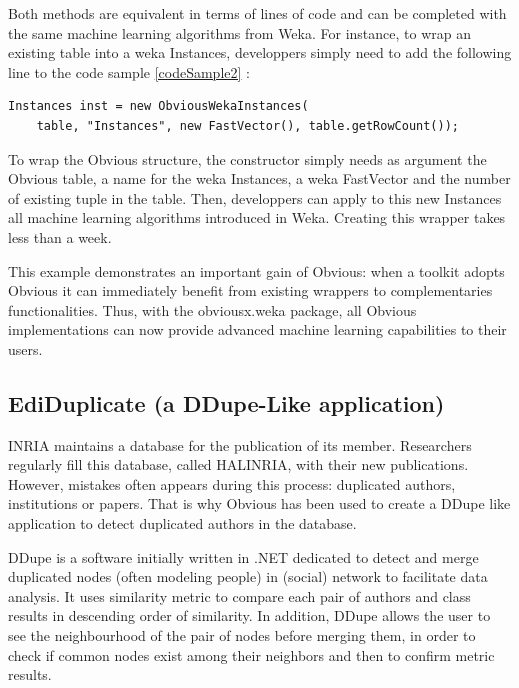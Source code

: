 Both methods are equivalent in terms of lines of code and can be completed with the same machine learning algorithms from Weka. For instance, to wrap an existing table into a weka Instances, developpers simply need to add the following line to the code sample \ref{codeSample2} :

\begin{lstlisting}
Instances inst = new ObviousWekaInstances(
    table, "Instances", new FastVector(), table.getRowCount());
\end{lstlisting}

To wrap the Obvious structure, the constructor simply needs as argument the Obvious table, a name for the weka Instances, a weka FastVector and the number of existing tuple in the table. Then, developpers can apply to this new Instances all machine learning algorithms introduced in Weka. Creating this wrapper takes less than a week.

This example demonstrates an important gain of Obvious: when a toolkit adopts Obvious it can immediately benefit from existing wrappers to complementaries functionalities. Thus, with the obviousx.weka package, all Obvious implementations can now provide advanced machine learning capabilities to their users.

\subsection{EdiDuplicate (a DDupe-Like application)}

INRIA maintains a database for the publication of its member. Researchers regularly fill this database, called HALINRIA, with their new publications. However, mistakes often appears during this process: duplicated authors, institutions or papers. That is why Obvious has been used to create a DDupe like application to detect duplicated authors in the database.

DDupe is a software initially written in .NET dedicated to detect and merge duplicated nodes (often modeling people)  in (social) network to facilitate data analysis. It uses similarity metric to compare each pair  of authors and class results in descending order of similarity. In addition, DDupe allows the user to see the neighbourhood of the pair of nodes before merging them, in order to check if common nodes exist among their neighbors and then to confirm metric results.

